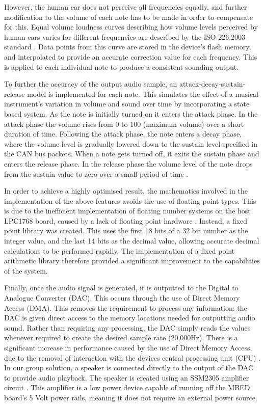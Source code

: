 However, the human ear does not perceive all frequencies equally, and further 
modification to the volume of each note has to be made in order to compensate 
for this. Equal volume loudness curves describing how volume levels perceived by 
human ears varies for different frequencies are described 
by the ISO 226:2003 standard \cite{iso-226}. 
Data points from this curve are stored in the device's flash memory, and 
interpolated to provide an accurate correction value for each frequency. This is 
applied to each individual note to produce a consistent sounding output. 
\par\bigskip\noindent
To further the accuracy of the output audio sample, an attack-decay-sustain-release 
model is implemented for each note. This simulates the effect of a musical 
instrument's variation in volume and sound over time by incorporating a state 
based system. As the note is initially turned on it enters the attack phase. 
In the attack phase the volume rises from 0 to 100 (maximum volume) over a 
short duration of time.
Following the attack phase, the note enters a decay phase, where the volume level 
is gradually lowered down to the sustain level specified in the CAN bus packets. 
When a note gets turned off, it exits the sustain phase and enters the release phase. 
In the release phase the volume level of the note drops from the sustain value to 
zero over a small period of time \cite{asr-book}. 
\par\bigskip\noindent
In order to achieve a highly optimised result, the mathematics involved in the 
implementation of the above features avoids the use of floating point types. 
This is due to the inefficient implementation of floating number systems on the 
host LPC1768 board, caused by a lack of floating point hardware 
\cite{kormanyos2013real, lpc1768-datasheet}.
Instead, a fixed point library was created. This uses the first 18 bits of a 
32 bit number as the integer value, and the last 14 bits as the decimal value, 
allowing accurate decimal calculations to be performed rapidly. 
The implementation of a fixed point arithmetic library therefore provided a 
significant improvement to the capabilities of the system. 
\par\bigskip\noindent
Finally, once the audio signal is generated, it is outputted to the Digital to 
Analogue Converter (DAC). This occurs through the use of Direct Memory Access (DMA).
This removes the requirement to process any information: the DAC is given 
direct access to the memory locations needed for outputting audio sound. Rather 
than requiring any processing, the DAC simply reads the values whenever required 
to create the desired sample rate (20,000Hz).
There is a significant increase in performance caused by the use of Direct Memory 
Access, due to the removal of interaction with the devices central processing unit
(CPU) \cite{barr1999programming}. 
In our group solution, a speaker is connected directly to the output of the DAC 
to provide audio playback. 
The speaker is created using an SSM2305 amplifier circuit \cite{speaker}. This 
amplifier is a low power device capable of running off the MBED board's 
5 Volt power rails, meaning it does not require an external power source. 

